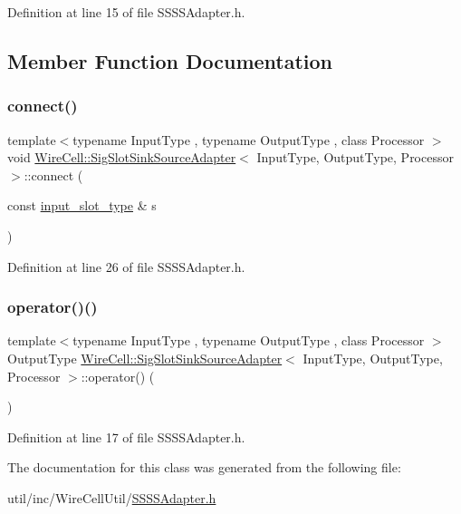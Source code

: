 Definition at line 15 of file S\+S\+S\+S\+Adapter.\+h.



\subsection{Member Function Documentation}
\mbox{\label{class_wire_cell_1_1_sig_slot_sink_source_adapter_a7a0f80852f4df14504bf89b56b23ba48}} 
\subsubsection{\texorpdfstring{connect()}{connect()}}
{\footnotesize\ttfamily template$<$typename Input\+Type , typename Output\+Type , class Processor $>$ \\
void \hyperlink{class_wire_cell_1_1_sig_slot_sink_source_adapter}{Wire\+Cell\+::\+Sig\+Slot\+Sink\+Source\+Adapter}$<$ Input\+Type, Output\+Type, Processor $>$\+::connect (\begin{DoxyParamCaption}\item[{const \hyperlink{class_wire_cell_1_1_sig_slot_sink_source_adapter_ab53f4d64b24e8ff5bc0f7ebd3ceca7dc}{input\+\_\+slot\+\_\+type} \&}]{s }\end{DoxyParamCaption})\hspace{0.3cm}{\ttfamily [inline]}}



Definition at line 26 of file S\+S\+S\+S\+Adapter.\+h.

\mbox{\label{class_wire_cell_1_1_sig_slot_sink_source_adapter_aff6b867ecd4cd3e387b0a4d75a7484d7}} 
\subsubsection{\texorpdfstring{operator()()}{operator()()}}
{\footnotesize\ttfamily template$<$typename Input\+Type , typename Output\+Type , class Processor $>$ \\
Output\+Type \hyperlink{class_wire_cell_1_1_sig_slot_sink_source_adapter}{Wire\+Cell\+::\+Sig\+Slot\+Sink\+Source\+Adapter}$<$ Input\+Type, Output\+Type, Processor $>$\+::operator() (\begin{DoxyParamCaption}{ }\end{DoxyParamCaption})\hspace{0.3cm}{\ttfamily [inline]}}



Definition at line 17 of file S\+S\+S\+S\+Adapter.\+h.



The documentation for this class was generated from the following file\+:\begin{DoxyCompactItemize}
\item 
util/inc/\+Wire\+Cell\+Util/\hyperlink{_s_s_s_s_adapter_8h}{S\+S\+S\+S\+Adapter.\+h}\end{DoxyCompactItemize}
